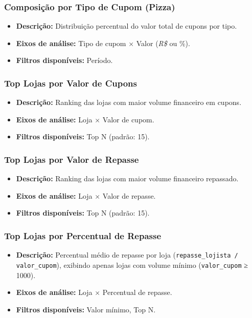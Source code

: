 \documentclass[12pt]{article}
\begin{document}
\subsubsection{Composição por Tipo de Cupom (Pizza)}
\begin{itemize}
    \item \textbf{Descrição:} Distribuição percentual do valor total de cupons por tipo.
    \item \textbf{Eixos de análise:} Tipo de cupom × Valor (\textit{R\$} ou \%).
    \item \textbf{Filtros disponíveis:} Período.
\end{itemize}

\subsubsection{Top Lojas por Valor de Cupons}
\begin{itemize}
    \item \textbf{Descrição:} Ranking das lojas com maior volume financeiro em cupons.
    \item \textbf{Eixos de análise:} Loja × Valor de cupom.
    \item \textbf{Filtros disponíveis:} Top N (padrão: 15).
\end{itemize}

\subsubsection{Top Lojas por Valor de Repasse}
\begin{itemize}
    \item \textbf{Descrição:} Ranking das lojas com maior volume financeiro repassado.
    \item \textbf{Eixos de análise:} Loja × Valor de repasse.
    \item \textbf{Filtros disponíveis:} Top N (padrão: 15).
\end{itemize}

\subsubsection{Top Lojas por Percentual de Repasse}
\begin{itemize}
    \item \textbf{Descrição:} Percentual médio de repasse por loja (\texttt{repasse\_lojista / valor\_cupom}), exibindo apenas lojas com volume mínimo (\texttt{valor\_cupom} ≥ 1000).
    \item \textbf{Eixos de análise:} Loja × Percentual de repasse.
    \item \textbf{Filtros disponíveis:} Valor mínimo, Top N.
\end{itemize}
\end{document}
